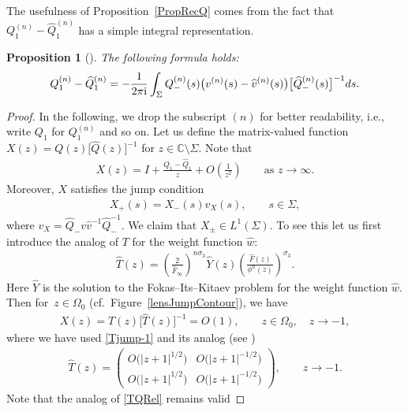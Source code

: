 \documentclass[11pt]{article}
\numberwithin{equation}{section}
\newcommand{\C}{\mathbb{C}}
\newcommand{\Id}{I}
\newcommand{\hw}{\widehat w}
\newcommand{\bQ}{ Q}
\newcommand{\hQ}{{\widehat Q}}
\newcommand{\bv}{v}
\newcommand{\hv}{{\widehat v}}
\newcommand{\hF}{\widehat F}
\newcommand{\I}{\mathrm{i}}
\newtheorem{Proposition}[Theorem]{Proposition}
 { \theoremstyle{definition}
\newtheorem{Definition}[Theorem]{Definition}
\newtheorem{Note}[Theorem]{Note}
\newtheorem{Example}[Theorem]{Example}
\newtheorem{Remark}[Theorem]{Remark} }
\numberwithin{equation}{section}
\begin{document}
The usefulness of Proposition~\ref{PropRecQ} comes from the fact that $\bQ^{(n)}_1- \hQ^{(n)}_1$ has a simple integral representation.
\begin{Proposition}[{\cite[Proposition~4.9]{CD}}]
The following formula holds:
\begin{align}\label{QIntForm}
 \bQ^{(n)}_1- \hQ^{(n)}_1 = -\frac{1}{2\pi\I}\int_\Sigma \bQ^{(n)}_-(s)\big(\bv^{(n)}(s)-\hv^{(n)}(s)\big)\big[\hQ^{(n)}_-(s)\big]^{-1} {\rm d}s.
\end{align}
\end{Proposition}
\begin{proof}
In the following, we drop the subscript $(n)$ for better readability, i.e., write $\bQ_1$ for $\bQ^{(n)}_1$ and so on. Let us define the matrix-valued function $X(z) = \bQ(z) \big[\hQ(z)\big]^{-1}$ for $z \in \C \setminus \Sigma$. Note that
\begin{align}\label{Rformula}
 X(z) = \Id + \frac{\bQ_1-\hQ_1}{z} + O\left(\frac{1}{z^2}\right) \qquad \text{as } z \to \infty.
\end{align}
Moreover, $X$ satisfies the jump condition
\begin{align*}
 X_+(s) = X_-(s)v_X(s), \qquad s\in \Sigma,
\end{align*}
where $v_X = \hQ_- \bv \hv^{-1} \hQ_-^{-1}$. We claim that $X_\pm \in L^1(\Sigma)$. To see this let us first introduce the analog of $T$ for the weight function $\hw$:
\begin{align*}
 \widehat T(z) = \left(\frac{2}{\hF_\infty}\right)^{n\sigma_3} \widehat Y(z) \left(\frac{\hF(z)}{\phi^n(z)}\right)^{\sigma_3}.
\end{align*}
Here $\hat Y$ is the solution to the Fokas--Its--Kitaev problem for the weight function $\hw$. Then for~${z \in \Omega_0}$ (cf.\ Figure~\ref{lensJumpContour}), we have
\begin{align*}%
 X(z) = T(z)\big[\widehat T(z)\big]^{-1} = O(1), \qquad z\in \Omega_0, \quad z\to-1,
\end{align*}
where we have used \eqref{Tjump-1} and its analog (see \cite[Section~2]{KMVV})
\begin{align}\label{hTjump-1}
 \widehat T(z) = \begin{pmatrix}
 O\big(|z+1|^{1/2}\big) & O\big(|z+1|^{-1/2}\big)
 \\
 O\big(|z+1|^{1/2}\big) & O\big(|z+1|^{-1/2}\big)
 \end{pmatrix}, \qquad z \to -1.
\end{align}
Note that the analog of \eqref{TQRel} remains valid

\end{proof}
\end{document}
